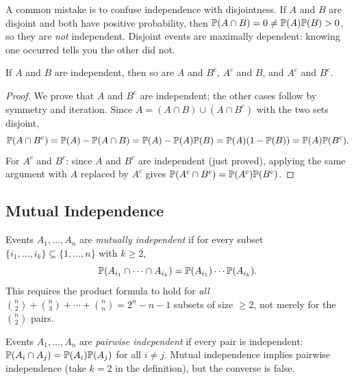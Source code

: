 \documentclass[11pt,a4paper]{article}
\begin{document}
\begin{warning}[title={Independent $\neq$ Disjoint}]
A common mistake is to confuse independence with disjointness. If $A$ and
$B$ are disjoint and both have positive probability, then
$\mathbb{P}(A \cap B) = 0 \neq \mathbb{P}(A)\mathbb{P}(B) > 0$, so they are
\emph{not} independent. Disjoint events are maximally dependent:
knowing one occurred tells you the other did not.
\end{warning}

\begin{proposition}
\label{prop:indep_complement}
If $A$ and $B$ are independent, then so are $A$ and $B^c$, $A^c$ and $B$,
and $A^c$ and $B^c$.
\end{proposition}

\begin{proof}
We prove that $A$ and $B^c$ are independent; the other cases follow by
symmetry and iteration. Since $A = (A \cap B) \cup (A \cap B^c)$ with
the two sets disjoint,
\[
    \mathbb{P}(A \cap B^c) = \mathbb{P}(A) - \mathbb{P}(A \cap B)
    = \mathbb{P}(A) - \mathbb{P}(A)\mathbb{P}(B)
    = \mathbb{P}(A)(1 - \mathbb{P}(B))
    = \mathbb{P}(A)\mathbb{P}(B^c).
\]
For $A^c$ and $B^c$: since $A$ and $B^c$ are independent (just proved),
applying the same argument with $A$ replaced by $A^c$ gives
$\mathbb{P}(A^c \cap B^c) = \mathbb{P}(A^c)\mathbb{P}(B^c)$.
\end{proof}

\subsection{Mutual Independence}

\begin{definition}
\label{def:mutual_indep}
Events $A_1, \ldots, A_n$ are \emph{mutually independent} if for every
subset $\{i_1, \ldots, i_k\} \subseteq \{1, \ldots, n\}$ with
$k \geq 2$,
\[
    \mathbb{P}(A_{i_1} \cap \cdots \cap A_{i_k})
    = \mathbb{P}(A_{i_1}) \cdots \mathbb{P}(A_{i_k}).
\]
This requires the product formula to hold for \emph{all}
$\binom{n}{2} + \binom{n}{3} + \cdots + \binom{n}{n} = 2^n - n - 1$
subsets of size $\geq 2$, not merely for the $\binom{n}{2}$ pairs.
\end{definition}

\begin{remark}
\label{rem:pairwise_def}
Events $A_1, \ldots, A_n$ are \emph{pairwise independent} if every pair
is independent:
$\mathbb{P}(A_i \cap A_j) = \mathbb{P}(A_i)\mathbb{P}(A_j)$
for all $i \neq j$. Mutual independence implies pairwise independence
(take $k = 2$ in the definition), but the converse is false.
\end{remark}
\end{document}
